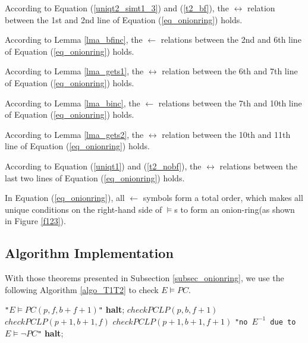 \documentclass[journal]{IEEEtran}
\begin{document}
\begin{IEEEproof}
According to Equation (\ref{uniqt2_simt1_3}) and (\ref{t2_bf}),
the $\boldsymbol{\leftrightarrow}$ relation between the 1st and 2nd line of Equation (\ref{eq_onionring}) holds.

According to Lemma \ref{lma_bfinc},
the $\boldsymbol{\gets}$ relations between the 2nd and 6th line of Equation (\ref{eq_onionring}) holds.

According to Lemma \ref{lma_gets1},
the $\boldsymbol{\leftrightarrow}$ relation between the 6th and 7th line of Equation (\ref{eq_onionring}) holds.

According to Lemma \ref{lma_binc},
the $\boldsymbol{\gets}$ relations between the 7th and 10th line of Equation (\ref{eq_onionring}) holds.

According to Lemma \ref{lma_gets2},
the $\boldsymbol{\leftrightarrow}$ relation between the 10th and 11th line of Equation (\ref{eq_onionring}) holds.

According to Equation (\ref{uniqt1}) and (\ref{t2_nobf}),
the $\boldsymbol{\leftrightarrow}$ relations between the last two lines of Equation (\ref{eq_onionring}) holds.
\end{IEEEproof}

In Equation (\ref{eq_onionring}),
all $\gets$ symbols form a total order,
which makes all unique conditions on the right-hand side of $\vDash$s to form an onion-ring(as shown in Figure \ref{f123}).

\subsection{Algorithm Implementation}

With those theorems presented in Subsection \ref{subsec_onionring},
we use the following Algorithm \ref{algo_T1T2} to check $E\vDash PC$.

\begin{algorithm}
\caption{$checkPCLP(p,b,f)$}
\label{algo_T1T2}
\begin{algorithmic}[1]
\PRINT \texttt{"$E\vDash PC(p,f,b+f+1)$"}\label{lab_t1t2_t2nobf}
\STATE \textbf{halt};
\STATE $checkPCLP(p,b,f+1)$\label{lab_t1t2_t2f}
\STATE $checkPCLP(p+1,b+1,f)$\label{lab_t1t2_t2b}
\STATE $checkPCLP(p+1,b+1,f+1)$\label{lab_t1t2_t2bf}
\ELSE
\PRINT \texttt{"no $E^{-1}$ due to $E\vDash\neg PC$"}\label{lab_t1t2_sat}
\STATE \textbf{halt};
\ENDIF
\end{algorithmic}
\end{algorithm}
\end{document}
